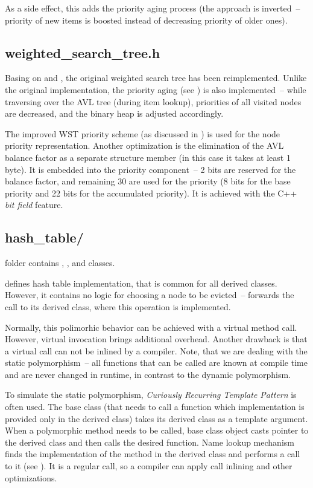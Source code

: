 As a side effect, this adds the priority aging process (the approach is inverted~-- priority of new items is boosted instead of decreasing priority of older ones).

\subsection{weighted\_search\_tree.h}
Basing on \cite{park90} and \cite{park94}, the original weighted search tree has been reimplemented. Unlike the original implementation, the priority aging (see ) is also implemented~-- while traversing over the AVL tree (during item lookup), priorities of all visited nodes are decreased, and the binary heap is adjusted accordingly.

The improved WST priority scheme (as discussed in ) is used for the node priority representation. Another optimization is the elimination of the AVL balance factor as a separate structure member (in this case it takes at least 1 byte). It is embedded into the priority component~-- 2 bits are reserved for the balance factor, and remaining 30 are used for the priority (8 bits for the base priority and 22 bits for the accumulated priority). It is achieved with the C++ \emph{bit field} feature.

\subsection{hash\_table/}

 folder contains , , and  classes.

 defines hash table implementation, that is common for all derived classes. However, it contains no logic for choosing a node to be evicted~--  forwards the call to its derived class, where this operation is implemented.

Normally, this polimorhic behavior can be achieved with a virtual method call. However, virtual invocation brings additional overhead. Another drawback is that a virtual call can not be inlined by a compiler. Note, that we are dealing with the static polymorphism~-- all functions that can be called are known at compile time and are never changed in runtime, in contrast to the dynamic polymorphism.

To simulate the static polymorphism, \emph{Curiously Recurring Template Pattern} is often used\cite{crtp}. The base class (that needs to call a function which implementation is provided only in the derived class) takes its derived class as a template argument. When a polymorphic method needs to be called, base class object casts  pointer to the derived class and then calls the desired function. Name lookup mechanism finds the implementation of the method in the derived class and performs a call to it (see ). It is a regular call, so a compiler can apply call inlining and other optimizations.

